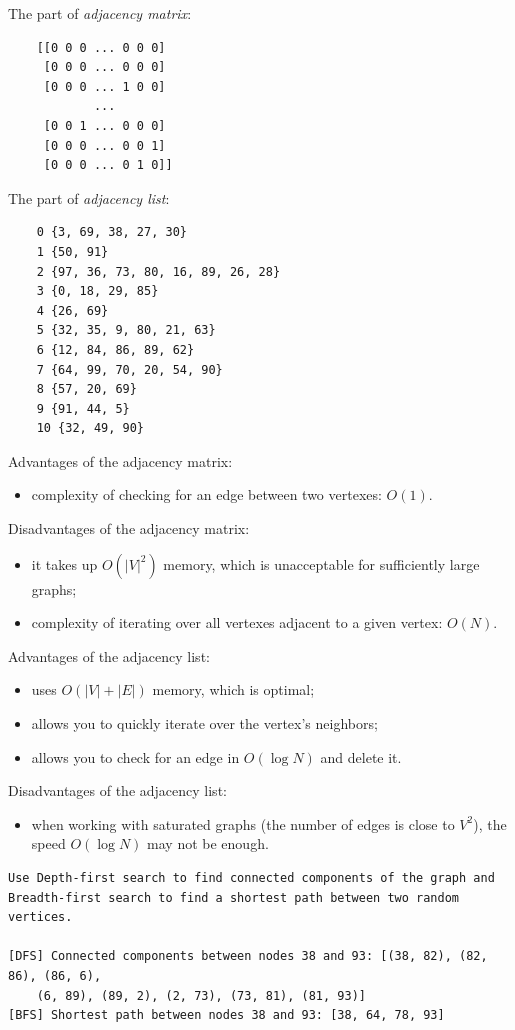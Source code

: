 The part of \textit{adjacency matrix}:

\begin{verbatim}
    [[0 0 0 ... 0 0 0]
     [0 0 0 ... 0 0 0]
     [0 0 0 ... 1 0 0]
            ...
     [0 0 1 ... 0 0 0]
     [0 0 0 ... 0 0 1]
     [0 0 0 ... 0 1 0]]
\end{verbatim}

The part of \textit{adjacency list}:

\begin{verbatim}
    0 {3, 69, 38, 27, 30}
    1 {50, 91}
    2 {97, 36, 73, 80, 16, 89, 26, 28}
    3 {0, 18, 29, 85}
    4 {26, 69}
    5 {32, 35, 9, 80, 21, 63}
    6 {12, 84, 86, 89, 62}
    7 {64, 99, 70, 20, 54, 90}
    8 {57, 20, 69}
    9 {91, 44, 5}
    10 {32, 49, 90}
\end{verbatim}

Advantages of the adjacency matrix:
\begin{itemize}
    \item complexity of checking for an edge between two vertexes: $O(1)$.
\end{itemize}

Disadvantages of the adjacency matrix:
\begin{itemize}
    \item it takes up $O(\lvert V \rvert^2)$ memory, which is unacceptable for sufficiently large graphs;
    \item complexity of iterating over all vertexes adjacent to a given vertex: $O(N)$.
\end{itemize}

Advantages of the adjacency list:
\begin{itemize}
    \item uses $O(\lvert V \rvert + \lvert E \rvert)$ memory, which is optimal;
    \item allows you to quickly iterate over the vertex's neighbors;
    \item allows you to check for an edge in $O(\log{N})$ and delete it.
\end{itemize}

Disadvantages of the adjacency list:
\begin{itemize}
    \item when working with saturated graphs (the number of edges is close to $V^2$), the speed $O(\log{N})$ may not be enough.
\end{itemize}

\begin{verbatim}
Use Depth-first search to find connected components of the graph and
Breadth-first search to find a shortest path between two random vertices.

[DFS] Connected components between nodes 38 and 93: [(38, 82), (82, 86), (86, 6),
    (6, 89), (89, 2), (2, 73), (73, 81), (81, 93)]
[BFS] Shortest path between nodes 38 and 93: [38, 64, 78, 93]
\end{verbatim}


